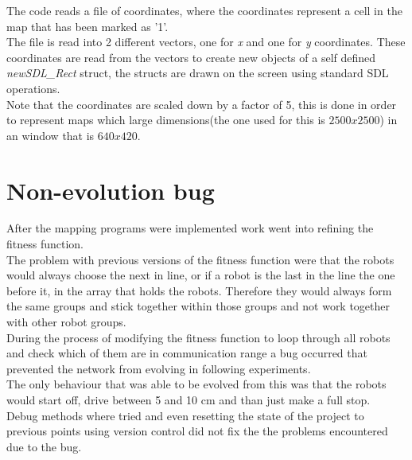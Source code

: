 The code reads a file of coordinates, where the coordinates represent a cell in the map that has been marked as '1'.\\
The file is read into 2 different vectors, one for \textit{x} and one for \textit{y} coordinates. These coordinates are read from the vectors to create new objects of a self defined \textit{newSDL\_Rect} struct, the structs are drawn on the screen using standard SDL operations. \\
Note that the coordinates are scaled down by a factor of 5, this is done in order to represent maps which large dimensions(the one used for this is $2500 x 2500$) in an window that is $640 x 420$. 

\section{Non-evolution bug}
After the mapping programs were implemented work went into refining the fitness function. \\
The problem with previous versions of the fitness function were that the robots would always choose the next in line, or if a robot is the last in the line the one before it, in the array that holds the robots. Therefore they would always form the  same groups and stick together within those groups and not work together with other robot groups.\\
During the process of modifying the fitness function to loop through all robots and check which of them are in communication range a bug occurred that prevented the network from evolving in following experiments. \\
The only behaviour that was able to be evolved from this was that the robots would start off, drive between 5 and 10 cm and than just make a full stop.\\
Debug methods where tried and even resetting the state of the project to previous points using version control did not fix the the problems encountered due to the bug. \\

